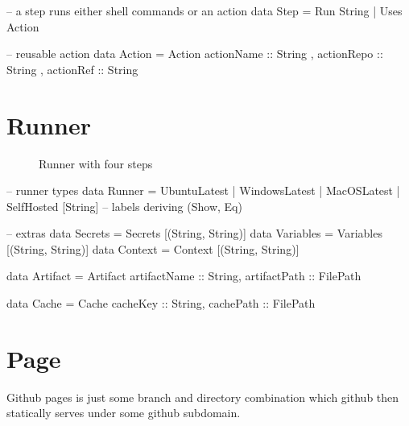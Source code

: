\documentclass[openany, 12pt]{book}
\begin{document}
\begin{haskell}{}
-- a step runs either shell commands or an action
data Step
  = Run String
  | Uses Action

-- reusable action
data Action = Action
  { actionName :: String
  , actionRepo :: String
  , actionRef  :: String
  }
\end{haskell}

\chapter{Runner}

\begin{figure}[H]
	\begin{center}
	\end{center}
	\caption{Runner with four steps}
\end{figure}

\begin{haskell}{}
-- runner types
data Runner
    = UbuntuLatest
    | WindowsLatest
    | MacOSLatest
    | SelfHosted [String] -- labels
deriving (Show, Eq)

-- extras
data Secrets   = Secrets   [(String, String)]
data Variables = Variables [(String, String)]
data Context   = Context    [(String, String)]

data Artifact  = Artifact
    { artifactName :: String,
      artifactPath :: FilePath }

data Cache     = Cache
    { cacheKey :: String,
      cachePath :: FilePath }
\end{haskell}

\chapter{Page}
Github pages is just some branch and directory combination which github then
statically serves under some github subdomain.
\end{document}
